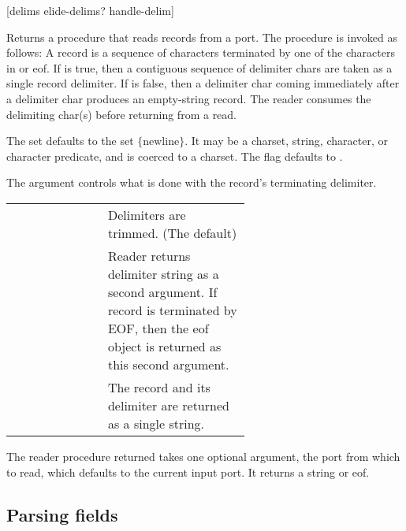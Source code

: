 {[delims elide-delims? handle-delim]} {\proc}
\begin{desc}
    Returns a procedure that reads records from a port. The
    procedure is invoked as follows:
    A record is a sequence of characters terminated by one of the characters
    in  or eof. If  is true, then a contiguous
    sequence of delimiter chars are taken as a single record delimiter.  If
     is false, then a delimiter char coming immediately
    after a delimiter char produces an empty-string record. The reader
    consumes the delimiting char(s) before returning from a read.

    The  set defaults to the set $\{\mbox{newline}\}$. 
    It may be a charset, string, character, or character predicate, 
    and is coerced to a charset. 
    The  flag defaults to .

    The  argument controls what is done with the record's
    terminating delimiter.
        \begin{inset}
        \begin{tabular}{lp{0.6\linewidth}}
        \ex{'trim} & Delimiters are trimmed. (The default)\\
        \ex{'split}& Reader returns delimiter string as a second argument.
                If record is terminated by EOF, then the eof object is 
                returned as this second argument. \\
        \ex{'concat} & The record and its delimiter are returned as
                       a single string.
        \end{tabular}
        \end{inset}

    The reader procedure returned takes one optional argument, the port
    from which to read, which defaults to the current input port. It returns
    a string or eof.
\end{desc}


\subsection{Parsing fields}
\label{sec:field-splitter}


